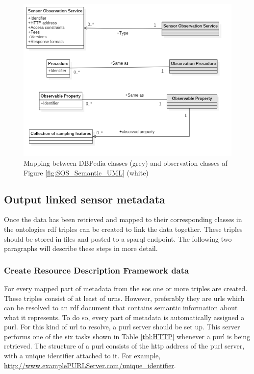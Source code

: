  \begin{figure}
 	\centering
 	\includegraphics[width=0.9\linewidth]{UML/DBPedia_to_SKB.PNG}
 	\caption{Mapping between DBPedia classes (grey) and observation classes af Figure \ref{fig:SOS_Semantic_UML} (white)}
 	\label{fig:SOS_DBPedia}
 \end{figure}

\subsection{Output linked sensor metadata}
\label{par:publishLD}

Once the data has been retrieved and mapped to their corresponding classes in the ontologies \ac{rdf} triples can be created to link the data together. These triples should be stored in files and posted to a \ac{sparql} endpoint. The following two paragraphs will describe these steps in more detail.


\subsubsection{Create Resource Description Framework data}
\label{par:createRDF}
For every mapped part of metadata from the \ac{sos} one or more triples are created. These triples consist of at least of \acp{urn}. However, preferably they are \acp{url} which can be resolved to an \ac{rdf} document that contains semantic information about what it represents. To do so, every part of metadata is automatically assigned a \acf{purl}. For this kind of \ac{url} to resolve, a \ac{purl} server should be set up. This server performs one of the six tasks shown in Table \ref{tbl:HTTP} whenever a \ac{purl} is being retrieved. The structure of a \ac{purl} consists of the \ac{http} address of the \ac{purl} server, with a unique identifier attached to it. For example, \url{http://www.examplePURLServer.com/unique\_identifier}. 

